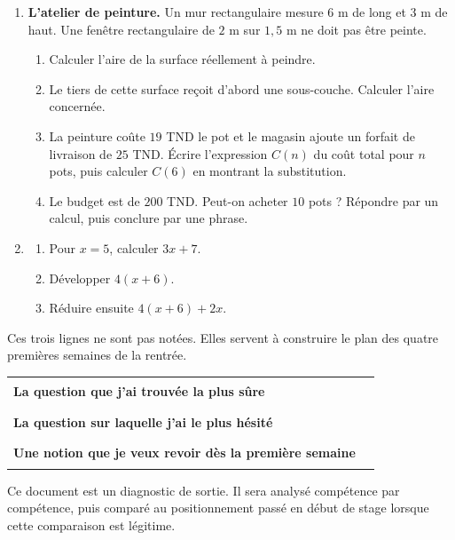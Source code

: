 \documentclass[10pt,a4paper]{article}
\begin{document}
\needspace{68mm}\par\vspace{3mm}
\begin{enumerate}
\needspace{22mm}
\item[\textbf{C1.}] \textbf{L'atelier de peinture.} Un mur rectangulaire mesure $6$ m de long et $3$ m de haut.
Une fenêtre rectangulaire de $2$ m sur $1{,}5$ m ne doit pas être peinte.
\begin{enumerate}
\item Calculer l'aire de la surface réellement à peindre.
\item Le tiers de cette surface reçoit d'abord une sous-couche. Calculer l'aire concernée.
\item La peinture coûte $19$ TND le pot et le magasin ajoute un forfait de livraison de $25$ TND.
Écrire l'expression $C(n)$ du coût total pour $n$ pots, puis calculer $C(6)$ en montrant la substitution.
\item Le budget est de $200$ TND. Peut-on acheter $10$ pots ? Répondre par un calcul, puis conclure par une phrase.
\end{enumerate}
\par\vspace{1.2mm}
\needspace{22mm}
\item[\textbf{C2.}] \begin{enumerate}
\item Pour $x = 5$, calculer $3x + 7$.
\item Développer $4(x + 6)$.
\item Réduire ensuite $4(x + 6) + 2x$.
\end{enumerate}
\par\vspace{1.2mm}
\end{enumerate}
\brouillon{\dimexpr\textheight/3\relax}
\newpage
{}
\begin{methodbox}Ces trois lignes ne sont pas notées. Elles servent à construire le plan des quatre premières semaines de la rentrée.\end{methodbox}
\par\noindent\begin{tabularx}{\linewidth}{>{\bfseries}p{62mm} X}
\toprule
La question que j'ai trouvée la plus sûre & \rule{85mm}{0.32pt} \\
La question sur laquelle j'ai le plus hésité & \rule{85mm}{0.32pt} \\
Une notion que je veux revoir dès la première semaine & \rule{85mm}{0.32pt} \\
\bottomrule\end{tabularx}
\vfill
\begin{graybox}\small Ce document est un diagnostic de sortie. Il sera analysé compétence par compétence, puis comparé au positionnement passé en début de stage lorsque cette comparaison est légitime.\end{graybox}
\end{document}
